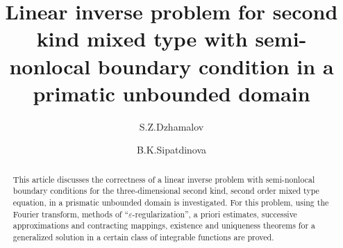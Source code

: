 \begin{englishtitle} %
\title{Linear inverse problem for second kind mixed type with semi-nonlocal boundary condition in a primatic unbounded domain}
\author{S.Z.Dzhamalov \and  B.K.Sipatdinova
}

\maketitle

\begin{abstract}
This article discusses the correctness of a linear inverse problem with semi-nonlocal boundary conditions for the three-dimensional second kind, second order mixed type equation, in a prismatic unbounded domain is investigated. For this problem, using the Fourier transform, methods of ``$\varepsilon$-regularization'', a priori estimates, successive approximations and contracting mappings, existence and uniqueness theorems for a generalized solution in a certain class of integrable functions are proved.

\end{abstract}
\end{englishtitle}






